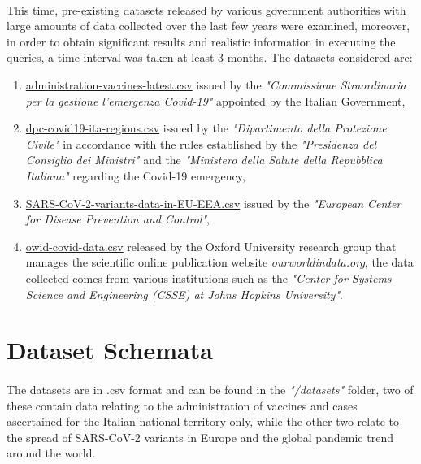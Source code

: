 \documentclass[a4paper,12pt]{article}
\begin{document}
\paragraph{} This time, pre-existing datasets released by various government authorities with large amounts of data collected over the last few years were examined, moreover, in order to obtain significant results and realistic information in executing the queries, a time interval was taken at least 3 months. The datasets considered are:
  \begin{enumerate}[noitemsep]
    \item \href{https://raw.githubusercontent.com/italia/covid19-opendata-vaccini/master/dati/somministrazioni-vaccini-latest.csv}{administration-vaccines-latest.csv} issued by the \emph{"Commissione Straordinaria per la gestione l’emergenza Covid-19"} appointed by the Italian Government,
    \item \href{https://raw.githubusercontent.com/pcm-dpc/COVID-19/master/dati-regioni/dpc-covid19-ita-regioni.csv}{dpc-covid19-ita-regions.csv} issued by the \emph{"Dipartimento della Protezione Civile"} in accordance with the rules established by the \emph{"Presidenza del Consiglio dei Ministri"} and the \emph{"Ministero della Salute della Repubblica Italiana"} regarding the Covid-19 emergency,
    \item \href{https://www.ecdc.europa.eu/en/publications-data/data-virus-variants-covid-19-eueea}{SARS-CoV-2-variants-data-in-EU-EEA.csv} issued by the \emph{"European Center for Disease Prevention and Control"},
    \item \href{https://raw.githubusercontent.com/owid/covid-19-data/master/public/data/owid-covid-data.csv}{owid-covid-data.csv} released by the Oxford University research group that manages the scientific online publication website \emph{ourworldindata.org}, the data collected comes from various institutions such as the \emph{"Center for Systems Science and Engineering (CSSE) at Johns Hopkins University"}.
   \end{enumerate}
\newpage

\section{Dataset Schemata}
\paragraph{} The datasets are in .csv format and can be found in the \emph{"/datasets"} folder, two of these contain data relating to the administration of vaccines and cases ascertained for the Italian national territory only, while the other two relate to the spread of SARS-CoV-2 variants in Europe and the global pandemic trend around the world.
\end{document}
